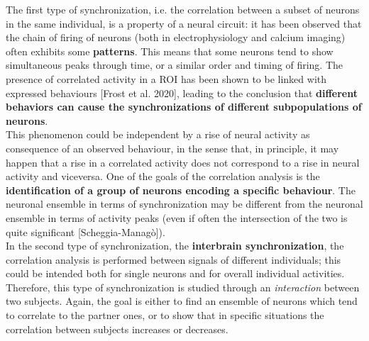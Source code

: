 \documentclass[a4paper]{article}
\begin{document}
The first type of synchronization, i.e. the correlation between a subset of neurons in the same individual, is a property of a neural circuit: it has been observed that the chain of firing of neurons (both in electrophysiology and calcium imaging) often exhibits some \textbf{patterns}. This means that some neurons tend to show simultaneous peaks through time, or a similar order and timing of firing. The presence of correlated activity in a ROI has been shown to be linked with expressed behaviours [Frost et al. 2020], leading to the conclusion that \textbf{different behaviors can cause the synchronizations of different  subpopulations of neurons}.\\
This phenomenon could be independent by a rise of neural activity as consequence of an observed behaviour, in the sense that, in principle, it may happen that a rise in a correlated activity does not correspond to a rise in neural activity and viceversa. One of the goals of the correlation analysis is the \textbf{identification of a group of neurons encoding a specific behaviour}. The neuronal ensemble in terms of synchronization may be different from the neuronal ensemble in terms of activity peaks (even if often the intersection of the two is quite significant [Scheggia-Managò]).\\
In the second type of synchronization, the \textbf{interbrain synchronization}, the correlation analysis is performed between signals of different individuals; this could be intended both for single neurons and for  overall individual activities. Therefore, this type of synchronization is studied through an \textit{interaction} between two subjects. Again, the goal is either to find an ensemble of neurons which tend to correlate to the partner ones, or to show that in specific situations the correlation between subjects increases or decreases.\\
\end{document}
